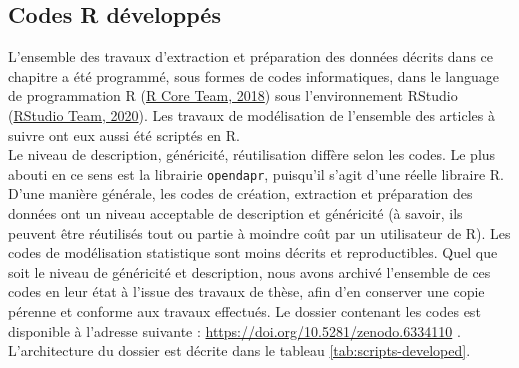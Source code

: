 \documentclass[12pt,twoside]{reedthesis}
\begin{document}
\hypertarget{scripts}{%
\subsection{Codes R développés}\label{scripts}}

L'ensemble des travaux d'extraction et préparation des données décrits dans ce chapitre a été programmé, sous formes de codes informatiques, dans le language de programmation R (\protect\hyperlink{ref-r_core_team_r_2018}{R Core Team, 2018}) sous l'environnement RStudio (\protect\hyperlink{ref-rstudio_team_rstudio_2020}{RStudio Team, 2020}). Les travaux de modélisation de l'ensemble des articles à suivre ont eux aussi été scriptés en R.\\

Le niveau de description, généricité, réutilisation diffère selon les codes. Le plus abouti en ce sens est la librairie \texttt{opendapr}, puisqu'il s'agit d'une réelle libraire R. D'une manière générale, les codes de création, extraction et préparation des données ont un niveau acceptable de description et généricité (à savoir, ils peuvent être réutilisés tout ou partie à moindre coût par un utilisateur de R). Les codes de modélisation statistique sont moins décrits et reproductibles. Quel que soit le niveau de généricité et description, nous avons archivé l'ensemble de ces codes en leur état à l'issue des travaux de thèse, afin d'en conserver une copie pérenne et conforme aux travaux effectués. Le dossier contenant les codes est disponible à l'adresse suivante : \url{https://doi.org/10.5281/zenodo.6334110} . L'architecture du dossier est décrite dans le tableau \ref{tab:scripts-developed}.
\end{document}
